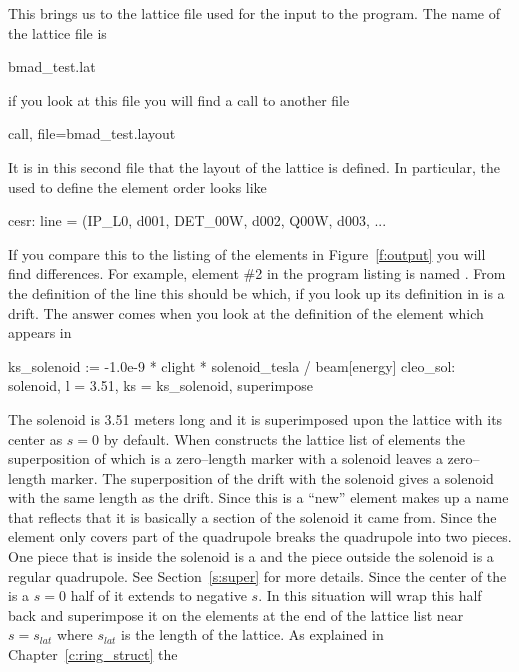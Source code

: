 {{{{{This brings us to the lattice file used for the input to the program.
The name of the lattice file is 
  \begin{example}
  bmad_test.lat
  \end{example} 
if you look at this file you will find a call to another file
  \begin{example}
  call, file=bmad_test.layout
  \end{example}
It is in this second file
that the layout of the lattice is defined. In particular, the  used
to define the element order looks like
\begin{example}
  cesr: line = (IP_L0, d001, DET_00W, d002, Q00W, d003, ...
\end{example}
If you compare this to the listing of the elements in
Figure~\ref{f:output} you will find differences. For example, element
\#2 in the program listing is named . From the
definition of the  line this should be  which, if
you look up its definition in  is a drift.  The
answer comes when you look at the definition of the 
element which appears in 
\begin{example}
  ks_solenoid    := -1.0e-9 * clight * solenoid_tesla / beam[energy]
  cleo_sol: solenoid, l = 3.51, ks = ks_solenoid, superimpose 
\end{example}
The solenoid is 3.51 meters long and it is superimposed upon the
lattice with its center as $s = 0$ by default. When 
constructs the lattice list of elements the superposition of
 which is a zero--length marker with a solenoid leaves a
zero--length marker. The superposition of the  drift with the
solenoid gives a solenoid with the same length as the drift. Since
this is a ``new'' element  makes up a name that
reflects that it is basically a section of the solenoid it came from.
Since the  element only covers part of the  quadrupole
 breaks the quadrupole into two pieces. One piece that
is inside the solenoid is a  and the piece outside the
solenoid is a regular quadrupole. See Section~\ref{s:super} for more
details. Since the center of the  is a $s = 0$ half of it
extends to negative $s$. In this situation  will wrap
this half back and superimpose it on the elements at the end of the lattice
list near $s = s_{lat}$ where $s_{lat}$ is the length of the lattice.
As explained in Chapter~\ref{c:ring_struct} the
}}}}}
